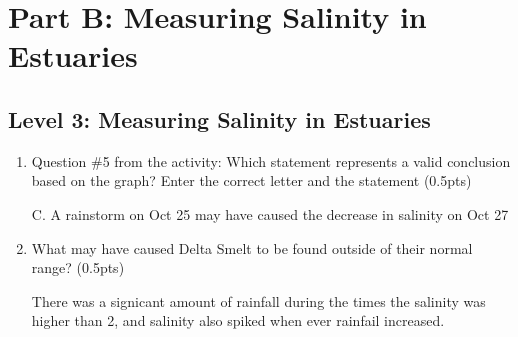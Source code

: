 \documentclass[12pt,a4paper]{article}
\begin{document}
\section*{Part B: Measuring Salinity in Estuaries}
\subsection*{Level 3: Measuring Salinity in Estuaries}
\begin{enumerate}[font=\bfseries, wide, resume]
    \item Question \#5 from the activity: Which statement represents a valid conclusion based on the graph?  Enter the correct letter and the statement (0.5pts)\par

    C. A rainstorm on Oct 25 may have caused the decrease in salinity on Oct 27

    \item What may have caused Delta Smelt to be found outside of their normal range? (0.5pts)\par 

    There was a signicant amount of rainfall during the times the salinity was higher than 2, and salinity also spiked when ever rainfail increased. 
\end{enumerate}
\end{document}
